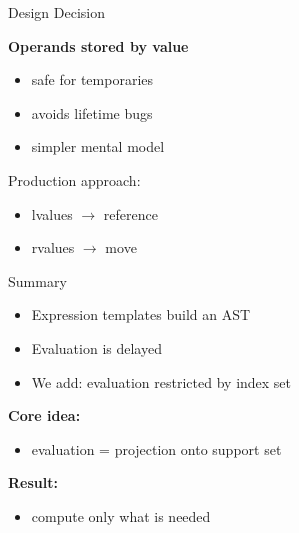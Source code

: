 \documentclass{beamer}
\begin{document}

\begin{frame}{Design Decision}

\textbf{Operands stored by value}

\vspace{1em}

\begin{itemize}
\item safe for temporaries
\item avoids lifetime bugs
\item simpler mental model
\end{itemize}

\vspace{1em}

Production approach:

\begin{itemize}
\item lvalues $\rightarrow$ reference
\item rvalues $\rightarrow$ move
\end{itemize}

\end{frame}


\begin{frame}{Summary}

\begin{itemize}
\item Expression templates build an AST
\item Evaluation is delayed
\item We add: evaluation restricted by index set
\end{itemize}

\vspace{1em}

\textbf{Core idea:}

\begin{itemize}
\item evaluation = projection onto support set
\end{itemize}

\vspace{1em}

\textbf{Result:}

\begin{itemize}
\item compute only what is needed
\end{itemize}

\end{frame}
\end{document}
